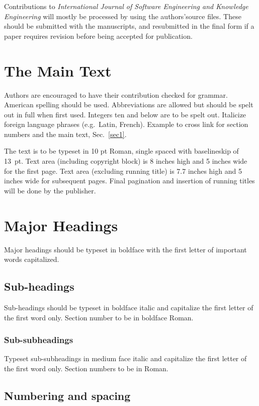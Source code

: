 \documentclass{ws-ijseke}
\begin{document}
Contributions to {\it International Journal of Software 
Engineering and Knowledge Engineering} will mostly be processed by
using the authors'source files. These should be submitted with
the manuscripts, and resubmitted in the final form if a paper requires
revision before being accepted for publication.

\section{The Main Text \label{sec1}}
Authors are encouraged to have their contribution checked for grammar. 
American spelling should be used. Abbreviations are
allowed but should be spelt out in full when first used. Integers ten
and below are to be spelt out. Italicize foreign language phrases
(e.g.~Latin, French). Example to cross link for section numbers and 
the main text, Sec.~\ref{sec1}.

The text is to be typeset in 10 pt Roman, single spaced with
baselineskip of 13~pt. Text area (including copyright block) is 
8 inches high and 5 inches wide for the first page.  Text area
(excluding running title) is 7.7 inches high and 5 inches wide for
subsequent pages.  Final pagination and insertion of running titles
will be done by the publisher.

\section{Major Headings}

Major headings should be typeset in boldface with the first letter of
important words capitalized.

\subsection{Sub-headings}

Sub-headings should be typeset in boldface italic and capitalize
the first letter of the first word only. Section number to be in
boldface Roman.

\subsubsection{Sub-subheadings}

Typeset sub-subheadings in medium face italic and capitalize the first
letter of the first word only. Section numbers to be in Roman.

\subsection{Numbering and spacing}
\end{document}
